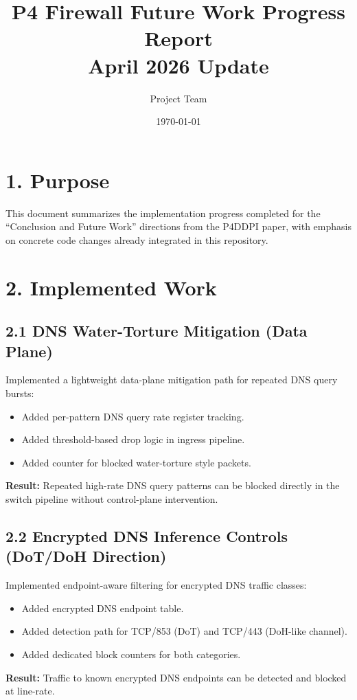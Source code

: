 \documentclass[11pt,a4paper]{article}
\title{P4 Firewall Future Work Progress Report\\\large April 2026 Update}
\author{Project Team}
\date{\today}
\begin{document}
\maketitle

\section*{1. Purpose}
This document summarizes the implementation progress completed for the ``Conclusion and Future Work'' directions from the P4DDPI paper, with emphasis on concrete code changes already integrated in this repository.

\section*{2. Implemented Work}
\subsection*{2.1 DNS Water-Torture Mitigation (Data Plane)}
Implemented a lightweight data-plane mitigation path for repeated DNS query bursts:
\begin{itemize}
    \item Added per-pattern DNS query rate register tracking.
    \item Added threshold-based drop logic in ingress pipeline.
    \item Added counter for blocked water-torture style packets.
\end{itemize}

\textbf{Result:} Repeated high-rate DNS query patterns can be blocked directly in the switch pipeline without control-plane intervention.

\subsection*{2.2 Encrypted DNS Inference Controls (DoT/DoH Direction)}
Implemented endpoint-aware filtering for encrypted DNS traffic classes:
\begin{itemize}
    \item Added encrypted DNS endpoint table.
    \item Added detection path for TCP/853 (DoT) and TCP/443 (DoH-like channel).
    \item Added dedicated block counters for both categories.
\end{itemize}

\textbf{Result:} Traffic to known encrypted DNS endpoints can be detected and blocked at line-rate.
\end{document}
